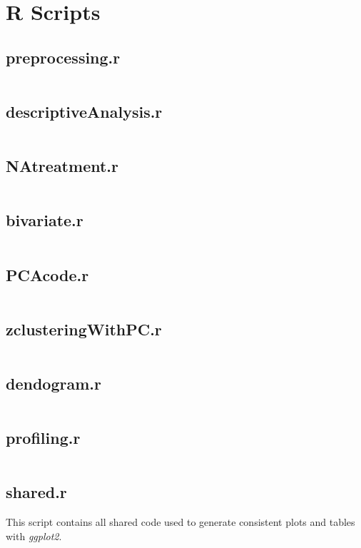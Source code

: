 

\section{R Scripts}%
\label{sec:r_scripts}

\newcommand{\mintedfile}[2]{
    \subsection{#1}%
    \label{sub:#1}
    #2
    \inputminted{r}{../../analysis/#1}
    \clearpage
}


\mintedfile{preprocessing.r}{}
\mintedfile{descriptiveAnalysis.r}{}
\mintedfile{NAtreatment.r}{}
\mintedfile{bivariate.r}{}
\mintedfile{PCAcode.r}{}
\mintedfile{zclusteringWithPC.r}{}
\mintedfile{dendogram.r}{}
\mintedfile{profiling.r}{}
\mintedfile{shared.r}{
    This script contains all shared code used to generate consistent plots and tables
    with \emph{ggplot2}.
}
